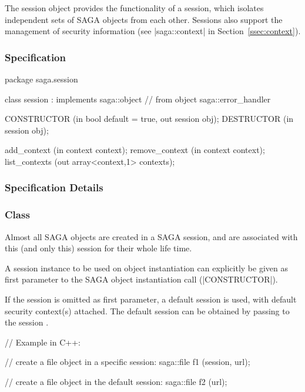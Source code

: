  
  The session object provides the functionality of a session,
   which isolates independent sets of SAGA objects
  from each other.  Sessions also support the management of
  security information (see |saga::context| in
  Section~\ref{ssec:context}).
 
 
 \subsubsection{Specification}
 
 
 \begin{myspec}
  package saga.session
  {
    class session : implements   saga::object
                 // from object  saga::error_handler
    {
      CONSTRUCTOR        (in  bool             default = true,
                          out session          obj);
      DESTRUCTOR         (in  session          obj);
 
      add_context        (in  context          context);
      remove_context     (in  context          context);
      list_contexts      (out array<context,1> contexts);
    }
  }
 \end{myspec}
 
 
 \subsubsection{Specification Details}
 
 \subsubsection*{Class }
 
    Almost all SAGA objects are created in a SAGA session, and
    are associated with this (and only this) session for their
    whole life time.
 
    A session instance to be used on object
    instantiation can explicitly be given as
    first parameter to the SAGA object instantiation call
    (|CONSTRUCTOR|).
 
    If the session is omitted as first parameter, a
    default session is used, with default security
    context(s) attached.
    The default session can be obtained by passing
     to the session .
 
 \newpage

 \begin{mycode}
      // Example in C++:
 
      // create a file object in a specific session:
      saga::file f1 (session, url);
 
      // create a file object in the default session:
      saga::file f2 (url);
 \end{mycode}
 
